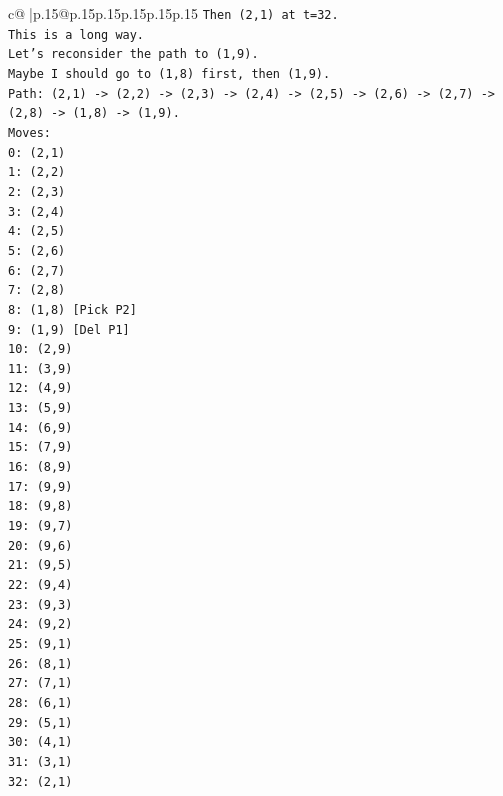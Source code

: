 \documentclass{article}
\begin{document}
{\begin{supertabular}{c@{$\;$}|p{.15\linewidth}@{}p{.15\linewidth}p{.15\linewidth}p{.15\linewidth}p{.15\linewidth}p{.15\linewidth}}
{{{\texttt{Then (2,1) at t=32.} \\
\texttt{This is a long way.} \\
\texttt{Let's reconsider the path to (1,9).} \\
\texttt{Maybe I should go to (1,8) first, then (1,9).} \\
\texttt{Path: (2,1) {-}> (2,2) {-}> (2,3) {-}> (2,4) {-}> (2,5) {-}> (2,6) {-}> (2,7) {-}> (2,8) {-}> (1,8) {-}> (1,9).} \\
\texttt{Moves:} \\
\texttt{0: (2,1)} \\
\texttt{1: (2,2)} \\
\texttt{2: (2,3)} \\
\texttt{3: (2,4)} \\
\texttt{4: (2,5)} \\
\texttt{5: (2,6)} \\
\texttt{6: (2,7)} \\
\texttt{7: (2,8)} \\
\texttt{8: (1,8) {[}Pick P2{]}} \\
\texttt{9: (1,9) {[}Del P1{]}} \\
\texttt{10: (2,9)} \\
\texttt{11: (3,9)} \\
\texttt{12: (4,9)} \\
\texttt{13: (5,9)} \\
\texttt{14: (6,9)} \\
\texttt{15: (7,9)} \\
\texttt{16: (8,9)} \\
\texttt{17: (9,9)} \\
\texttt{18: (9,8)} \\
\texttt{19: (9,7)} \\
\texttt{20: (9,6)} \\
\texttt{21: (9,5)} \\
\texttt{22: (9,4)} \\
\texttt{23: (9,3)} \\
\texttt{24: (9,2)} \\
\texttt{25: (9,1)} \\
\texttt{26: (8,1)} \\
\texttt{27: (7,1)} \\
\texttt{28: (6,1)} \\
\texttt{29: (5,1)} \\
\texttt{30: (4,1)} \\
\texttt{31: (3,1)} \\
\texttt{32: (2,1)} \\
}}}
\end{supertabular}}
\end{document}
